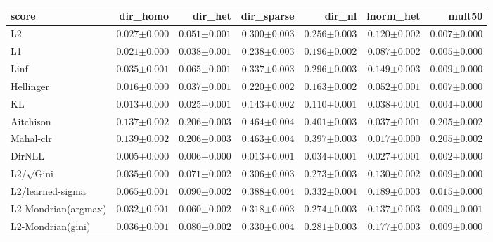 \begin{tabular}{lrrrrrr}
\toprule
score & dir\_homo & dir\_het & dir\_sparse & dir\_nl & lnorm\_het & mult50 \\
\midrule
L2 & $0.027{\scriptstyle\pm0.000}$ & $0.051{\scriptstyle\pm0.001}$ & $0.300{\scriptstyle\pm0.003}$ & $0.256{\scriptstyle\pm0.003}$ & $0.120{\scriptstyle\pm0.002}$ & $0.007{\scriptstyle\pm0.000}$ \\
L1 & $0.021{\scriptstyle\pm0.000}$ & $0.038{\scriptstyle\pm0.001}$ & $0.238{\scriptstyle\pm0.003}$ & $0.196{\scriptstyle\pm0.002}$ & $0.087{\scriptstyle\pm0.002}$ & $0.005{\scriptstyle\pm0.000}$ \\
Linf & $0.035{\scriptstyle\pm0.001}$ & $0.065{\scriptstyle\pm0.001}$ & $0.337{\scriptstyle\pm0.003}$ & $0.296{\scriptstyle\pm0.003}$ & $0.149{\scriptstyle\pm0.003}$ & $0.009{\scriptstyle\pm0.000}$ \\
Hellinger & $0.016{\scriptstyle\pm0.000}$ & $0.037{\scriptstyle\pm0.001}$ & $0.220{\scriptstyle\pm0.002}$ & $0.163{\scriptstyle\pm0.002}$ & $0.052{\scriptstyle\pm0.001}$ & $0.007{\scriptstyle\pm0.000}$ \\
KL & $0.013{\scriptstyle\pm0.000}$ & $0.025{\scriptstyle\pm0.001}$ & $0.143{\scriptstyle\pm0.002}$ & $0.110{\scriptstyle\pm0.001}$ & $0.038{\scriptstyle\pm0.001}$ & $0.004{\scriptstyle\pm0.000}$ \\
Aitchison & $0.137{\scriptstyle\pm0.002}$ & $0.206{\scriptstyle\pm0.003}$ & $0.464{\scriptstyle\pm0.004}$ & $0.401{\scriptstyle\pm0.003}$ & $0.037{\scriptstyle\pm0.001}$ & $0.205{\scriptstyle\pm0.002}$ \\
Mahal-clr & $0.139{\scriptstyle\pm0.002}$ & $0.206{\scriptstyle\pm0.003}$ & $0.463{\scriptstyle\pm0.004}$ & $0.397{\scriptstyle\pm0.003}$ & $\mathbf{0.017}{\scriptstyle\pm0.000}$ & $0.205{\scriptstyle\pm0.002}$ \\
DirNLL & $\mathbf{0.005}{\scriptstyle\pm0.000}$ & $\mathbf{0.006}{\scriptstyle\pm0.000}$ & $\mathbf{0.013}{\scriptstyle\pm0.001}$ & $\mathbf{0.034}{\scriptstyle\pm0.001}$ & $0.027{\scriptstyle\pm0.001}$ & $\mathbf{0.002}{\scriptstyle\pm0.000}$ \\
L2/$\sqrt{\mathrm{Gini}}$ & $0.035{\scriptstyle\pm0.000}$ & $0.071{\scriptstyle\pm0.002}$ & $0.306{\scriptstyle\pm0.003}$ & $0.273{\scriptstyle\pm0.003}$ & $0.130{\scriptstyle\pm0.002}$ & $0.009{\scriptstyle\pm0.000}$ \\
L2/learned-sigma & $0.065{\scriptstyle\pm0.001}$ & $0.090{\scriptstyle\pm0.002}$ & $0.388{\scriptstyle\pm0.004}$ & $0.332{\scriptstyle\pm0.004}$ & $0.189{\scriptstyle\pm0.003}$ & $0.015{\scriptstyle\pm0.000}$ \\
L2-Mondrian(argmax) & $0.032{\scriptstyle\pm0.001}$ & $0.060{\scriptstyle\pm0.002}$ & $0.318{\scriptstyle\pm0.003}$ & $0.274{\scriptstyle\pm0.003}$ & $0.137{\scriptstyle\pm0.003}$ & $0.009{\scriptstyle\pm0.001}$ \\
L2-Mondrian(gini) & $0.036{\scriptstyle\pm0.001}$ & $0.080{\scriptstyle\pm0.002}$ & $0.330{\scriptstyle\pm0.004}$ & $0.281{\scriptstyle\pm0.003}$ & $0.177{\scriptstyle\pm0.003}$ & $0.009{\scriptstyle\pm0.000}$ \\
\bottomrule
\end{tabular}